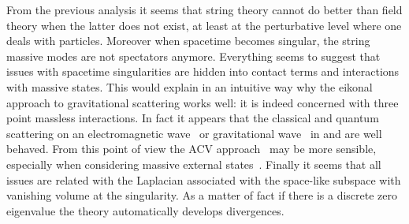From the previous analysis it seems that string theory cannot do better than field theory when the latter does not exist, at least at the perturbative level where one deals with particles.
Moreover when spacetime becomes singular, the string massive modes are not spectators anymore.
Everything seems to suggest that issues with spacetime singularities are hidden into contact terms and interactions with massive states.
This would explain in an intuitive way why the eikonal approach to gravitational scattering works well: it is indeed concerned with three point massless interactions.
In fact it appears that the classical and quantum scattering on an electromagnetic wave~\cite{Jackiw:1992:ElectromagneticFieldsMassless} or gravitational wave~\cite{tHooft:1987:GravitonDominanceUltrahighenergy} in \bo and \nbo are well behaved.
From this point of view the ACV approach~\cite{Soldate:1987:PartialwaveUnitarityClosedstring, Amati:1987:SuperstringCollisionsPlanckian} may be more sensible, especially when considering massive external states~\cite{Black:2012:HighEnergyString}.
Finally it seems that all issues are related with the Laplacian associated with the space-like subspace with vanishing volume at the singularity.
As a matter of fact if there is a discrete zero eigenvalue the theory automatically develops divergences.


